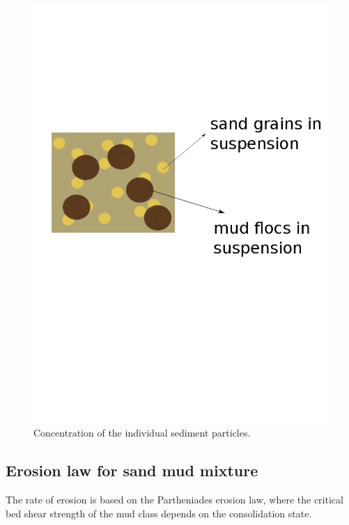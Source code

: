 \begin{figure}[H]
\begin{center}
\includegraphics[scale=0.3,angle=0]{graphics/mudsand_2.png}
\caption{Concentration of the individual sediment particles.}\label{fig:mudsand2}
\end{center}
\end{figure}

\subsection{Erosion law for sand mud mixture}
The rate of erosion is based on the Partheniades erosion law, where the
critical bed shear strength of the mud class depends on the consolidation
state.


